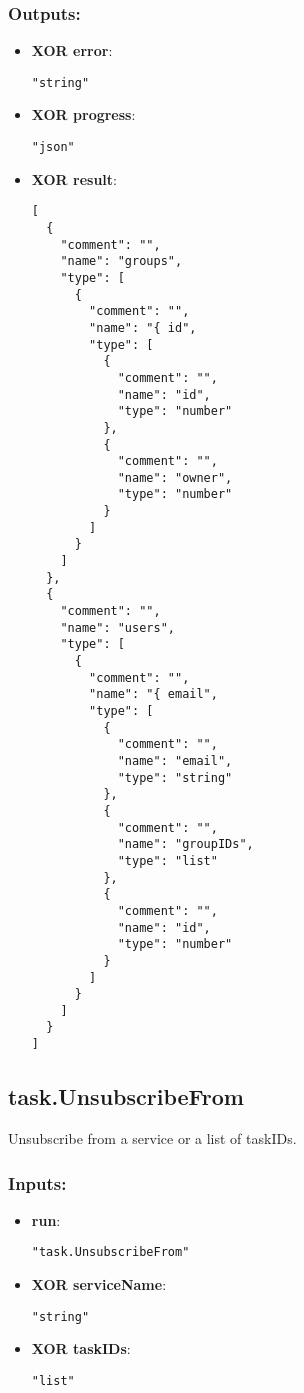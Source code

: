 \subsubsection*{Outputs:}
\begin{itemize}
    \item \textbf{XOR error}: 
\begin{lstlisting}
"string"
\end{lstlisting}
    \item \textbf{XOR progress}: 
\begin{lstlisting}
"json"
\end{lstlisting}
    \item \textbf{XOR result}: 
\begin{lstlisting}
[
  {
    "comment": "", 
    "name": "groups", 
    "type": [
      {
        "comment": "", 
        "name": "{ id", 
        "type": [
          {
            "comment": "", 
            "name": "id", 
            "type": "number"
          }, 
          {
            "comment": "", 
            "name": "owner", 
            "type": "number"
          }
        ]
      }
    ]
  }, 
  {
    "comment": "", 
    "name": "users", 
    "type": [
      {
        "comment": "", 
        "name": "{ email", 
        "type": [
          {
            "comment": "", 
            "name": "email", 
            "type": "string"
          }, 
          {
            "comment": "", 
            "name": "groupIDs", 
            "type": "list"
          }, 
          {
            "comment": "", 
            "name": "id", 
            "type": "number"
          }
        ]
      }
    ]
  }
]
\end{lstlisting}
  \end{itemize}

\subsection{task.UnsubscribeFrom}
Unsubscribe from a service or a list of taskIDs.
\subsubsection*{Inputs:}
\begin{itemize}
    \item \textbf{run}: 
\begin{lstlisting}
"task.UnsubscribeFrom"
\end{lstlisting}
    \item \textbf{XOR serviceName}: 
\begin{lstlisting}
"string"
\end{lstlisting}
    \item \textbf{XOR taskIDs}: 
\begin{lstlisting}
"list"
\end{lstlisting}
  \end{itemize}


